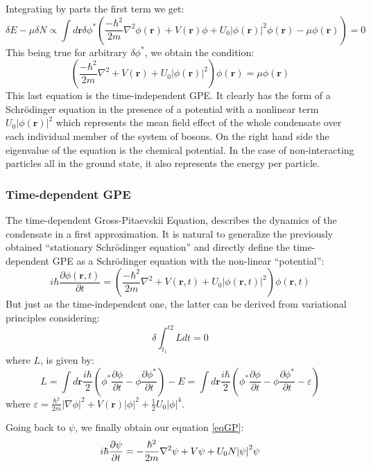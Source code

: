 \documentclass{article}
\begin{document}
Integrating by parts the first term we get:
$$
 \delta E-\mu \delta N \propto \int d\mathbf{r}\delta \phi^* \left(\frac{-\hbar^2}{2m}\nabla^2 \phi(\mathbf{r}) +V(\mathbf{r}) \phi +U_0 |\phi(\mathbf{r})|^2 \phi(\mathbf{r})-\mu \phi(\mathbf{r})\right)=0
$$
This being true for arbitrary $\delta \phi^*$, we obtain the condition:
\begin{equation}\label{GP_Eq1}
 \left(\frac{-\hbar^2}{2m}\nabla^2 +V(\mathbf{r}) +U_0 |\phi(\mathbf{r})|^2 \right)\phi(\mathbf{r})=\mu \phi(\mathbf{r})
\end{equation}
This last equation is the time-independent GPE. It clearly has the form of a Schrödinger equation in the presence of a potential with a nonlinear term $U_0|\phi(\mathbf{r})|^2$ which represents the mean field effect of the whole condensate over each individual member of the system of bosons. On the right hand side the eigenvalue of the equation is the chemical potential. In the case of non-interacting particles all in the ground state, it also represents the energy per particle.

\subsubsection*{Time-dependent GPE}
The time-dependent Gross-Pitaevskii Equation, describes the dynamics of the condensate in a first approximation. It is natural to generalize the previously obtained ``stationary Schrödinger equation'' and directly define the time-dependent GPE as a Schrödinger equation with the non-linear ``potential'': 
$$
 i\hbar \frac{\partial \phi(\mathbf{r},t)}{\partial t}=\left(\frac{-\hbar^2}{2m}\nabla^2 +V(\mathbf{r},t) +U_0 |\phi(\mathbf{r},t)|^2 \right)\phi(\mathbf{r},t)
$$
But just as the time-independent one, the latter can be derived from variational principles considering:
$$
 \delta \int_{t_1}^{t2}Ldt=0
$$
where $L$, is given by:
$$
  L=\int d\mathbf{r}\frac{i\hbar}{2}\left(\phi^*\frac{\partial \phi}{\partial t}-\phi \frac{\partial \phi^*}{\partial t}\right)-E =\int d\mathbf{r}\frac{i\hbar}{2}\left(\phi^*\frac{\partial \phi}{\partial t}-\phi \frac{\partial \phi^*}{\partial t}-\varepsilon\right)
$$
where $\varepsilon=\frac{\hbar^2}{2m}|\nabla\phi|^2+V(\mathbf{r})|\phi|^2+\frac{1}{2}U_0|\phi|^4$.

\bigskip \noindent
Going back to $\psi$, we finally obtain our equation \eqref{eqGP}:
$$
i\hbar \pdv{\psi}{t} = -\frac{\hbar^2}{2m} \laplacian \psi + V \psi + U_0 N \abs{\psi}^2 \psi
$$

\newpage
\end{document}
